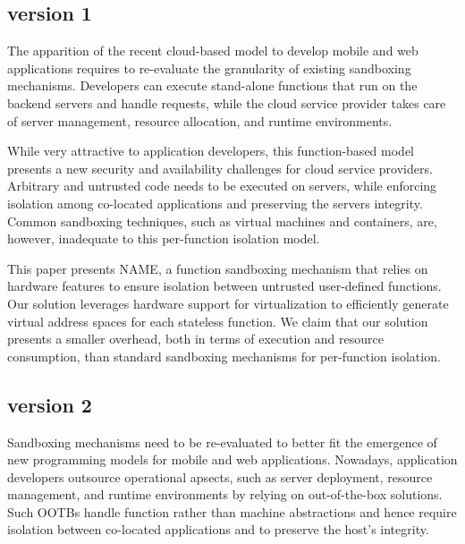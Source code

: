 \documentclass[12pt]{article}
\begin{document}
\subsection{version 1}
The apparition of the recent cloud-based model to develop mobile and web applications requires to re-evaluate the granularity of existing sandboxing mechanisms.
Developers can execute stand-alone functions that run on the backend servers and handle requests, while the cloud service provider takes care of server management, resource allocation, and runtime environments.

While very attractive to application developers, this function-based model presents a new security and availability challenges for cloud service providers.
Arbitrary and untrusted code needs to be executed on servers, while enforcing isolation among co-located applications and preserving the servers integrity.
Common sandboxing techniques, such as virtual machines and containers, are, however, inadequate to this per-function isolation model.

This paper presents NAME, a function sandboxing mechanism that relies on hardware features to ensure isolation between untrusted user-defined functions.
Our solution leverages hardware support for virtualization to efficiently generate virtual address spaces for each stateless function.
We claim that our solution presents a smaller overhead, both in terms of execution and resource consumption, than standard sandboxing mechanisms for per-function isolation.\\


\subsection{version 2}

Sandboxing mechanisms need to be re-evaluated to better fit the emergence of new programming models for mobile and web applications.
Nowadays, application developers outsource operational apsects, such as server deployment, resource management, and runtime environments by relying on out-of-the-box solutions.
Such OOTBs handle function rather than machine abstractions and hence require isolation between co-located applications and to preserve the host's integrity.
\end{document}
